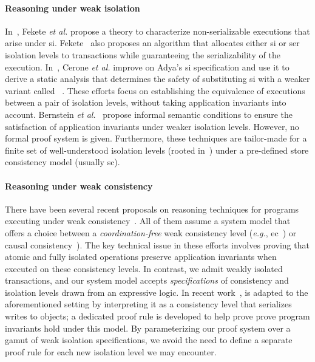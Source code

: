 \paragraph{Reasoning under weak isolation} In~\cite{feketessi}, Fekete
\emph{et al.} propose a theory to characterize non-serializable
executions that arise under {\sc si}. Fekete~\cite{fekete2005} also
proposes an algorithm that allocates either {\sc si} or {\sc ser}
isolation levels to transactions while guaranteeing the
serializability of the execution. In~\cite{gotsmanpodc16}, Cerone
\emph{et al.} improve on Adya's {\sc si} specification and use it to
derive a static analysis that determines the safety of substituting
{\sc si} with a weaker variant called ~\cite{psi}.  These efforts focus on establishing the
equivalence of executions between a pair of isolation levels, without
taking application invariants into account.  Bernstein \emph{et
  al.}~\cite{bern2000} propose informal semantic conditions to ensure
the satisfaction of application invariants under weaker isolation
levels.  However, no formal proof system is given.  Furthermore, these
techniques are tailor-made for a finite set of well-understood
isolation levels (rooted in~\cite{berenson}) under a pre-defined
store consistency model (usually {\sc sc}).

\paragraph{Reasoning under weak consistency} There have been several
recent proposals on reasoning techniques for programs executing under
weak consistency~\cite{bailisvldb, alvarocalm,
  gotsmanpopl16,redblueatc, redblueosdi, ecinec}. All of them assume a
system model that offers a choice between a \emph{coordination-free}
weak consistency level (\emph{e.g.}, {\sc ec}~\cite{redblueosdi,
  redblueatc, ecinec, alvarocalm, bailisvldb}) or causal
consistency~\cite{gotsmanpopl16}). The key technical issue in these
efforts involves proving that atomic and fully isolated operations
preserve application invariants when executed on these consistency
levels.  In contrast, we admit weakly isolated transactions, and our
system model accepts \emph{specifications} of consistency and
isolation levels drawn from an expressive logic.  In recent
work~\cite{gotsmanpopl16},  is
adapted to the aforementioned setting by interpreting it as a
consistency level that serializes writes to objects; a dedicated proof
rule is developed to help prove prove program invariants hold under
this model. By parameterizing our proof system over a gamut of weak
isolation specifications, we avoid the need to define a separate proof
rule for each new isolation level we may encounter.

